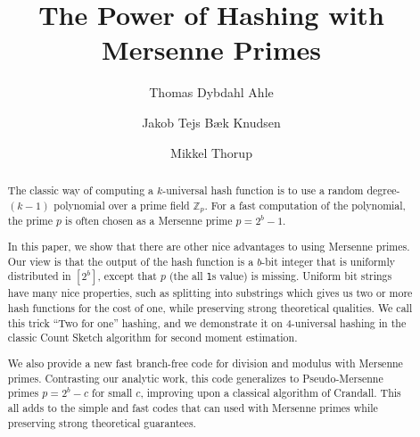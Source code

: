 

\title{The Power of Hashing with Mersenne Primes}

\author[1]{Thomas Dybdahl Ahle}
\author[2]{Jakob Tejs B\ae{}k Knudsen}
\author[2]{Mikkel Thorup}


\maketitle

\begin{abstract}
The classic way of computing a $k$-universal hash function is to use a random degree-$(k-1)$ polynomial over a prime field $\mathbb Z_p$.
For a fast computation of the polynomial, the prime $p$ is often chosen as a Mersenne prime $p=2^b-1$.

In this paper, we show that there are other nice advantages to using Mersenne primes.
Our view is that the output of the hash function is a $b$-bit integer that is uniformly distributed in $[2^b]$, except that $p$ (the all \texttt1s value) is missing.
Uniform bit strings have many nice properties, such as splitting into substrings which gives us two or more hash functions for the cost of one, while preserving strong theoretical qualities.
We call this trick ``Two for one'' hashing, and we demonstrate it on 4-universal hashing in the classic Count Sketch algorithm for second moment estimation.

We also provide a new fast branch-free code for division and modulus
with Mersenne primes. Contrasting our analytic work, this code
generalizes to Pseudo-Mersenne primes $p=2^b-c$ for small $c$,
improving upon a classical algorithm of Crandall.  This all
adds to the simple and fast codes that can used with Mersenne primes
while preserving strong theoretical guarantees.
\end{abstract}

\setcounter{tocdepth}{2}
\renewcommand{\contentsname}{}
\vspace{-3.5em}
\tableofcontents
\newpage







% 













